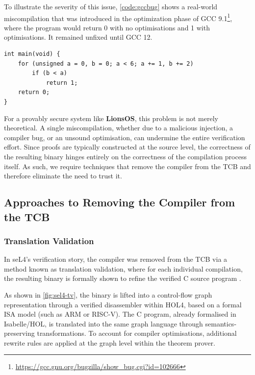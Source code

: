 To illustrate the severity of this issue, \autoref{code:gccbug} shows a real-world miscompilation that was introduced in the optimization phase of GCC 9.1\footnote{\url{https://gcc.gnu.org/bugzilla/show_bug.cgi?id=102666}}, where the program would return 0 with no optimisations and 1 with optimisations. It remained unfixed until GCC 12.

\begin{code}
\begin{verbatim}
int main(void) {
    for (unsigned a = 0, b = 0; a < 6; a += 1, b += 2)
        if (b < a)
            return 1;
    return 0;
}
\end{verbatim}
\caption{Example of a miscompilation bug in GCC (Bug \href{https://gcc.gnu.org/bugzilla/show_bug.cgi?id=102666}{\#102666})}
\label{code:gccbug}
\end{code}


For a provably secure system like \textbf{LionsOS}, this problem is not merely theoretical. A single miscompilation, whether due to a malicious injection, a compiler bug, or an unsound optimisation, can undermine the entire verification effort. Since proofs are typically constructed at the source level, the correctness of the resulting binary hinges entirely on the correctness of the compilation process itself. As such, we require techniques that remove the compiler from the TCB and therefore eliminate the need to trust it.

\subsection{Approaches to Removing the Compiler from the TCB}
\subsubsection{Translation Validation}
In seL4's verification story, the compiler was removed from the TCB via a method known as translation validation, where for each individual compilation, the resulting binary is formally shown to refine the verified C source program \citep{sewell2013TV}.

As shown in \autoref{fig:sel4-tv}, the binary is lifted into a control-flow graph representation through a verified disassembler within HOL4, based on a formal ISA model (such as ARM or RISC-V). The C program, already formalised in Isabelle/HOL, is translated into the same graph language through semantics-preserving transformations. To account for compiler optimisations, additional rewrite rules are applied at the graph level within the theorem prover.

